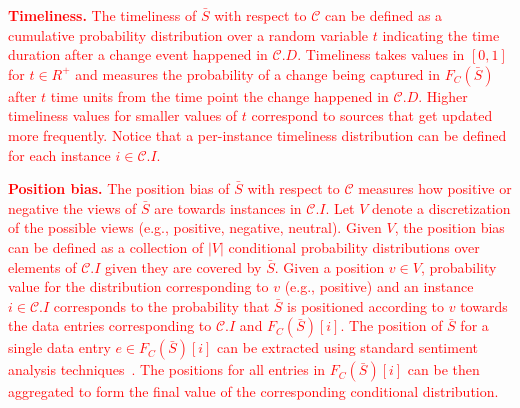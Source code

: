 \documentclass{sig-alternate}
\begin{document}
\textcolor{red}{\vspace{3pt}\noindent\textbf{Timeliness.} The timeliness of $\bar{S}$ with respect to $\mathcal{C}$ can be defined as a cumulative probability distribution over a random variable $t$ indicating the time duration after a change event happened in $\mathcal{C}.D$. Timeliness takes values in $[0,1]$ for $t \in R^+$ and measures the probability of a change being captured in $F_C(\bar{S})$ after $t$ time units from the time point the change happened in $\mathcal{C}.D$. Higher timeliness values for smaller values of $t$ correspond to sources that get updated more frequently. Notice that a per-instance timeliness distribution can be defined for each instance $i \in \mathcal{C}.I$.}


\textcolor{red}{\vspace{3pt}\noindent\textbf{Position bias.} The position bias of $\bar{S}$ with respect to $\mathcal{C}$ measures how positive or negative the views of $\bar{S}$ are towards instances in $\mathcal{C}.I$. Let $V$ denote a discretization of the possible views (e.g., positive, negative, neutral). Given $V$, the position bias can be defined as a collection of $|V|$ conditional probability distributions over elements of $\mathcal{C}.I$ given they are covered by $\bar{S}$. Given a position $v \in V$, probability value for the distribution corresponding to $v$ (e.g., positive) and an instance $i \in \mathcal{C}.I$ corresponds to the probability that $\bar{S}$ is positioned according to $v$ towards the data entries corresponding to $\mathcal{C}.I$ and 
$F_C(\bar{S})[i]$. The position of $\bar{S}$ for a single data entry $e \in F_C(\bar{S})[i]$ can be extracted using standard sentiment analysis techniques~\cite{pang:2002}. The positions for all entries in $F_C(\bar{S})[i]$ can be then aggregated to form the final value of the corresponding conditional distribution.}
\end{document}
